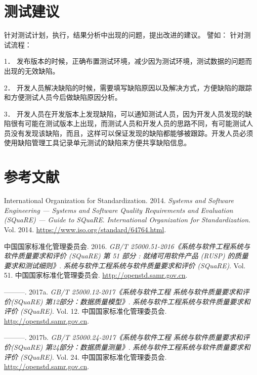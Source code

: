 \documentclass[hyperref, a4paper]{ctexart}
\begin{document}
\hypertarget{ux6d4bux8bd5ux5efaux8bae}{%
\section{测试建议}\label{ux6d4bux8bd5ux5efaux8bae}}

针对测试计划，执行，结果分析中出现的问题，提出改进的建议。 譬如：
针对测试流程：

1．
发布版本的时候，正确布置测试环境，减少因为测试环境，测试数据的问题而出现的无效缺陷。

2．
开发人员解决缺陷的时候，需要填写缺陷原因以及解决方式，方便缺陷的跟踪和方便测试人员今后做缺陷原因分析。

3．
开发人员在开发版本上发现缺陷，可以通知测试人员，因为开发人员发现的缺陷很有可能在测试版本上出现，而测试人员和开发人员的思路不同，有可能测试人员没有发现该缺陷，而且，这样可以保证发现的缺陷都能够被跟踪。开发人员必须使用缺陷管理工具记录单元测试的缺陷来方便共享缺陷信息。

\pagebreak

\hypertarget{ux53c2ux8003ux6587ux732e}{%
\section*{参考文献}\label{ux53c2ux8003ux6587ux732e}}

\hypertarget{refs}{}
\leavevmode\hypertarget{ref-innovativeInternationalisation}{}%
International Organization for Standardization. 2014. \emph{Systems and
Software Engineering --- Systems and Software Quality Requirements and
Evaluation (SQuaRE) --- Guide to SQuaRE}. \emph{International
Organization for Standardization}. Vol. 2014.
\url{https://www.iso.org/standard/64764.html}.

\leavevmode\hypertarget{ref-innovative1}{}%
中国国家标准化管理委员会. 2016. \emph{GB/T
25000.51-2016《系统与软件工程系统与软件质量要求和评价 (SQuaRE) 第 51
部分 : 就绪可用软件产品 (RUSP) 的质量要求和测试细则》}.
\emph{系统与软件工程系统与软件质量要求和评价 (SQuaRE)}. Vol. 51.
中国国家标准化管理委员会. \url{http://openstd.samr.gov.cn}.

\leavevmode\hypertarget{ref-innovative3}{}%
---------. 2017a. \emph{GB/T 25000.12-2017《系统与软件工程
系统与软件质量要求和评价(SQuaRE) 第12部分：数据质量模型》}.
\emph{系统与软件工程系统与软件质量要求和评价 (SQuaRE)}. Vol. 12.
中国国家标准化管理委员会. \url{http://openstd.samr.gov.cn}.

\leavevmode\hypertarget{ref-innovative4}{}%
---------. 2017b. \emph{GB/T 25000.24-2017《系统与软件工程
系统与软件质量要求和评价(SQuaRE) 第24部分：数据质量测量》}.
\emph{系统与软件工程系统与软件质量要求和评价 (SQuaRE)}. Vol. 24.
中国国家标准化管理委员会. \url{http://openstd.samr.gov.cn}.
\end{document}
